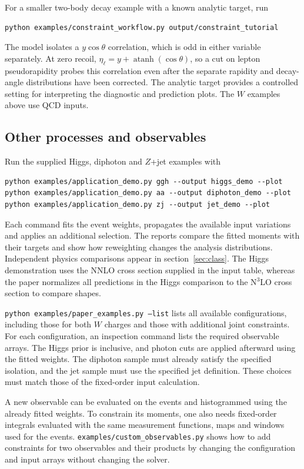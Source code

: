 For a smaller two-body decay example with a known analytic target, run
\begin{verbatim}
python examples/constraint_workflow.py output/constraint_tutorial
\end{verbatim}
The model isolates a $y\cos\theta$ correlation, which is odd in either variable separately. At zero recoil, $\eta_\ell=y+\operatorname{atanh}(\cos\theta)$, so a cut on lepton pseudorapidity probes this correlation even after the separate rapidity and decay-angle distributions have been corrected. The analytic target provides a controlled setting for interpreting the diagnostic and prediction plots. The $W$ examples above use QCD inputs.

\subsection{Other processes and observables}

\begin{samepage}
Run the supplied Higgs, diphoton and $Z$+jet examples with
\begin{verbatim}
python examples/application_demo.py ggh --output higgs_demo --plot
python examples/application_demo.py aa --output diphoton_demo --plot
python examples/application_demo.py zj --output jet_demo --plot
\end{verbatim}
\end{samepage}
Each command fits the event weights, propagates the available input variations and applies an additional selection. The reports compare the fitted moments with their targets and show how reweighting changes the analysis distributions. Independent physics comparisons appear in section~\ref{sec:class}. The Higgs demonstration uses the NNLO cross section supplied in the input table, whereas the paper normalizes all predictions in the Higgs comparison to the N$^3$LO cross section to compare shapes.

\texttt{python examples/paper\_examples.py --list} lists all available configurations, including those for both $W$ charges and those with additional joint constraints. For each configuration, an inspection command lists the required observable arrays. The Higgs prior is inclusive, and photon cuts are applied afterward using the fitted weights. The diphoton sample must already satisfy the specified isolation, and the jet sample must use the specified jet definition. These choices must match those of the fixed-order input calculation.

A new observable can be evaluated on the events and histogrammed using the already fitted weights. To constrain its moments, one also needs fixed-order integrals evaluated with the same measurement functions, maps and windows used for the events. \texttt{examples/custom\_observables.py} shows how to add constraints for two observables and their products by changing the configuration and input arrays without changing the solver.

